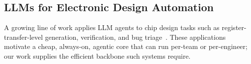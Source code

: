 \subsection{LLMs for Electronic Design Automation}
A growing line of work applies LLM agents to chip design tasks such as register-transfer-level generation, verification, and bug triage~\cite{liu2023chipnemo,blocklove2024chip}.
These applications motivate a cheap, always-on, agentic core that can run per-team or per-engineer; our work supplies the efficient backbone such systems require.

